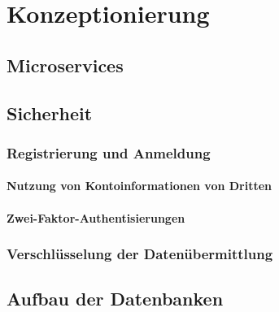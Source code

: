 \chapter{Konzeptionierung}\label{chap:Konzeptionierung}


\section{Microservices} \label{sec:Microservices}
\begin{comment}
    --> Genaue Bausteine der Implementierung
    --> einzelne Microservices näher betrachten
\end{comment}




\section{Sicherheit} \label{sec:Architektur}
\begin{comment}
    --> TLS
    --> User Anmeldung / Registrierung
        - Google / Facebook / Microsoft
\end{comment}

    \subsection{Registrierung und Anmeldung}
        \subsubsection{Nutzung von Kontoinformationen von Dritten}
        \subsubsection{Zwei-Faktor-Authentisierungen}

    \subsection{Verschlüsselung der Datenübermittlung}


\section{Aufbau der Datenbanken}
















